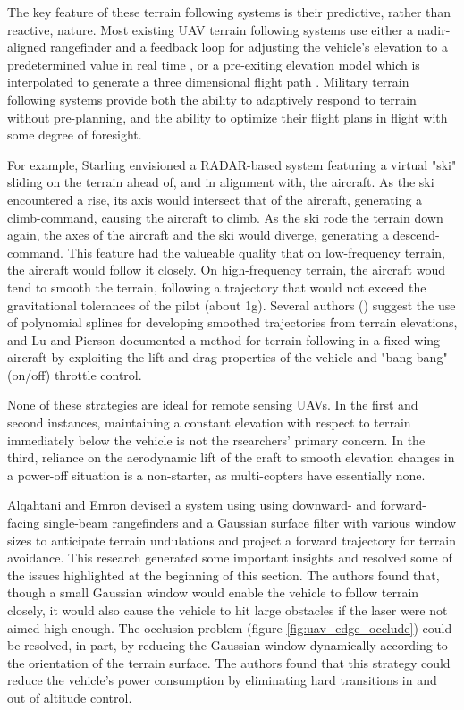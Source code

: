 \documentclass[10pt,a4paper]{report}
\begin{document}
The key feature of these terrain following systems is their predictive, rather than reactive, nature. Most existing UAV terrain following systems use either a nadir-aligned rangefinder and a feedback loop for adjusting the vehicle's elevation to a predetermined value in real time \cite{ArduPilot2017}, or a pre-exiting elevation model which is interpolated to generate a three dimensional flight path \cite{ArduPilot2017,Samar2011}. Military terrain following systems provide both the ability to adaptively respond to terrain without pre-planning, and the ability to optimize their flight plans in flight with some degree of foresight. 

For example, Starling \cite{Starling1971} envisioned a RADAR-based system featuring a virtual "ski" sliding on the terrain ahead of, and in alignment with, the aircraft. As the ski encountered a rise, its axis would intersect that of the aircraft, generating a climb-command, causing the aircraft to climb. As the ski rode the terrain down again, the axes of the aircraft and the ski would diverge, generating a descend-command. This feature had the valueable quality that on low-frequency terrain, the aircraft would follow it closely. On high-frequency terrain, the aircraft woud tend to smooth the terrain, following a trajectory that would not exceed the gravitational tolerances of the pilot (about 1g). Several authors (\cite{MENON1991,Popovic2017,Lu1995,Rahim2011,Samar2011}) suggest the use of polynomial splines for developing smoothed trajectories from terrain elevations, and Lu and Pierson \cite{Lu1995} documented a method for terrain-following in a fixed-wing aircraft by exploiting the lift and drag properties of the vehicle and "bang-bang" (on/off) throttle control. 

None of these strategies are ideal for remote sensing UAVs. In the first and second instances, maintaining a constant elevation with respect to terrain immediately below the vehicle is not the rsearchers' primary concern. In the third, reliance on the aerodynamic lift of the craft to smooth elevation changes in a power-off situation is a non-starter, as multi-copters have essentially none.

Alqahtani and Emron \cite{Alqahtani2018} devised a system using using downward- and forward-facing single-beam rangefinders and a Gaussian surface filter with various window sizes to anticipate terrain undulations and project a forward trajectory for terrain avoidance. This research generated some important insights and resolved some of the issues highlighted at the beginning of this section. The authors found that, though a small Gaussian window would enable the vehicle to follow terrain closely, it would also cause the vehicle to hit large obstacles if the laser were not aimed high enough. The occlusion problem (figure \ref{fig:uav_edge_occlude}) could be resolved, in part, by reducing the Gaussian window dynamically according to the orientation of the terrain surface. The authors found that this strategy could reduce the vehicle's power consumption by eliminating hard transitions in and out of altitude control.
\end{document}
